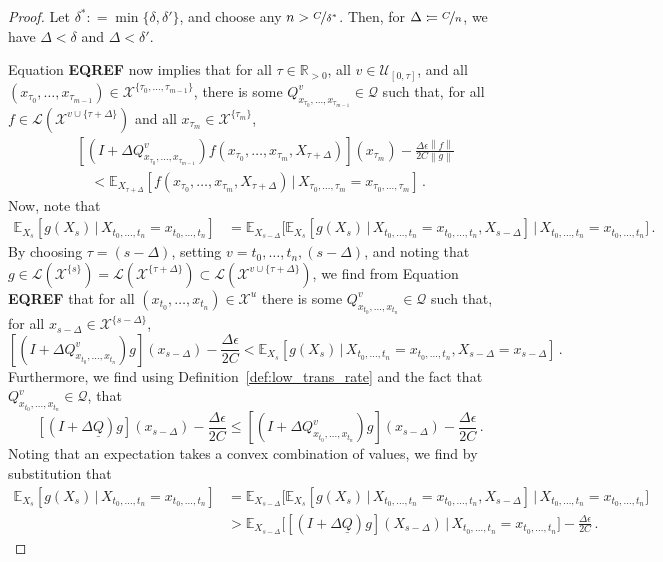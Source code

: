 \documentclass[10pt]{paper}
\newcommand{\reals}{\mathbb{R}}
\newcommand{\realspos}{\reals_{>0}}
\newcommand{\states}{\mathcal{X}}
\newcommand{\gambles}{\mathcal{L}}
\newcommand{\rateset}{\mathcal{Q}}
\newcommand{\lrate}{\underline{Q}}
\newcommand{\norm}[1]{\left\lVert #1 \right\rVert}
\newcommand{\coloneqq}{:\!=}
\begin{document}
\begin{proof}
Let $\delta^*\coloneqq\min\{\delta,\delta'\}$, and choose any $n>\nicefrac{C}{\delta^*}$. Then, for $\Delta\coloneqq\nicefrac{C}{n}$, we have $\Delta<\delta$ and $\Delta<\delta'$.

Equation {\bf EQREF} now implies that for all $\tau\in\realspos$, all $v\in\mathcal{U}_{[0,\tau]}$, and all $(x_{\tau_0},\ldots,x_{\tau_{m-1}})\in\states^{\{\tau_0,\ldots,\tau_{m-1}\}}$, there is some $Q^v_{x_{\tau_0},\ldots,x_{\tau_{m-1}}}\in\rateset$ such that, for all $f\in\gambles(\states^{v\cup\{\tau+\Delta\}})$ and all $x_{\tau_m}\in\states^{\{\tau_m\}}$,
\begin{align}
 &\left[(I + \Delta Q^v_{x_{\tau_0},\ldots,x_{\tau_{m-1}}})f(x_{\tau_0},\ldots,x_{\tau_m},X_{\tau+\Delta})\right](x_{\tau_m}) - \frac{\Delta\epsilon\norm{f}}{2C\norm{g}} \\
 &\quad< \mathbb{E}_{X_{\tau+\Delta}}[f(x_{\tau_0},\ldots,x_{\tau_m},X_{\tau+\Delta})\,\vert\,X_{\tau_0,\ldots,\tau_m}=x_{\tau_0,\ldots,\tau_m}]\,.
\end{align}
Now, note that
\begin{align*}
\mathbb{E}_{X_s}[g(X_s)\,\vert\,X_{t_0,\ldots,t_n}=x_{t_0,\ldots,t_n}] &= \mathbb{E}_{X_{s-\Delta}}\bigl[\mathbb{E}_{X_s}[g(X_s)\,\vert\,X_{t_0,\ldots,t_n}=x_{t_0,\ldots,t_n},X_{s-\Delta}]\,\vert\,X_{t_0,\ldots,t_n}=x_{t_0,\ldots,t_n}\bigr]\,.
\end{align*}
By choosing $\tau=(s-\Delta)$, setting $v=t_0,\ldots,t_n,(s-\Delta)$, and noting that $g\in\gambles(\states^{\{s\}})=\gambles(\states^{\{\tau+\Delta\}})\subset\gambles(\states^{v\cup\{\tau+\Delta\}})$, we find from Equation {\bf EQREF} that for all $(x_{t_0},\ldots,x_{t_n})\in\states^{u}$ there is some $Q^v_{x_{t_0},\ldots,x_{t_n}}\in\rateset$ such that, for all $x_{s-\Delta}\in\states^{\{s-\Delta\}}$,
\begin{equation*}
\left[(I + \Delta Q^v_{x_{t_0},\ldots,x_{t_n}})g\right](x_{s-\Delta}) - \frac{\Delta\epsilon}{2C} < \mathbb{E}_{X_s}[g(X_s)\,\vert\,X_{t_0,\ldots,t_n}=x_{t_0,\ldots,t_n},X_{s-\Delta}=x_{s-\Delta}]\,.
\end{equation*}
Furthermore, we find using Definition~\ref{def:low_trans_rate} and the fact that $Q^v_{x_{t_0},\ldots,x_{t_n}}\in\rateset$, that
\begin{equation*}
\left[(I + \Delta \lrate)g\right](x_{s-\Delta}) - \frac{\Delta\epsilon}{2C} \leq \left[(I + \Delta Q^v_{x_{t_0},\ldots,x_{t_n}})g\right](x_{s-\Delta}) - \frac{\Delta\epsilon}{2C}\,.
\end{equation*}
Noting that an expectation takes a convex combination of values, we find by substitution that
\begin{align*}
\mathbb{E}_{X_s}[g(X_s)\,\vert\,X_{t_0,\ldots,t_n}=x_{t_0,\ldots,t_n}] &= \mathbb{E}_{X_{s-\Delta}}\bigl[\mathbb{E}_{X_s}[g(X_s)\,\vert\,X_{t_0,\ldots,t_n}=x_{t_0,\ldots,t_n},X_{s-\Delta}]\,\vert\,X_{t_0,\ldots,t_n}=x_{t_0,\ldots,t_n}\bigr] \\
&> \mathbb{E}_{X_{s-\Delta}}\bigl[[(I+\Delta\lrate)g](X_{s-\Delta})\,\vert\,X_{t_0,\ldots,t_n}=x_{t_0,\ldots,t_n}\bigr] - \frac{\Delta\epsilon}{2C}\,.
\end{align*}


\end{proof}
\end{document}
